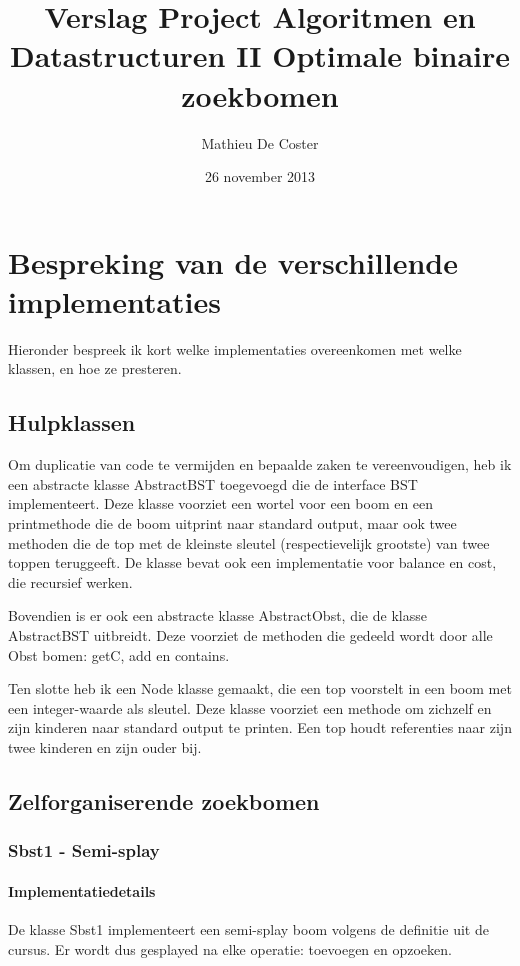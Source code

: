 \documentclass[titlepage,a4paper]{article}
\begin{document}
\title{Verslag Project Algoritmen en Datastructuren II Optimale binaire zoekbomen}
\author{Mathieu De Coster}
\date{26 november 2013}
\maketitle

\tableofcontents

\section{Bespreking van de verschillende implementaties}
Hieronder bespreek ik kort welke implementaties overeenkomen met welke klassen, en hoe ze presteren.

\subsection{Hulpklassen}
Om duplicatie van code te vermijden en bepaalde zaken te vereenvoudigen, heb ik een abstracte klasse AbstractBST toegevoegd die de interface BST implementeert. Deze klasse voorziet een wortel voor een boom en een printmethode die de boom uitprint naar standard output, maar ook twee methoden die de top met de kleinste sleutel (respectievelijk grootste) van twee toppen teruggeeft. De klasse bevat ook een implementatie voor balance en cost, die recursief werken.

Bovendien is er ook een abstracte klasse AbstractObst, die de klasse AbstractBST uitbreidt. Deze voorziet de methoden die gedeeld wordt door alle Obst bomen: getC, add en contains.

Ten slotte heb ik een Node klasse gemaakt, die een top voorstelt in een boom met een integer-waarde als sleutel. Deze klasse voorziet een methode om zichzelf en zijn kinderen naar standard output te printen. Een top houdt referenties naar zijn twee kinderen en zijn ouder bij.

\subsection{Zelforganiserende zoekbomen}
\subsubsection{Sbst1 - Semi-splay}
\paragraph{Implementatiedetails}
De klasse Sbst1 implementeert een semi-splay boom volgens de definitie uit de cursus.
Er wordt dus gesplayed na elke operatie: toevoegen en opzoeken.
\end{document}
